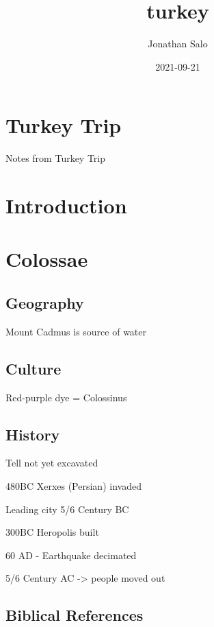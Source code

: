 \documentclass[
]{book}
\title{turkey}
\author{Jonathan Salo}
\date{2021-09-21}
\begin{document}
\maketitle

{
\setcounter{tocdepth}{1}
\tableofcontents
}
\hypertarget{turkey-trip}{%
\chapter{Turkey Trip}\label{turkey-trip}}

Notes from Turkey Trip

\hypertarget{intro}{%
\chapter{Introduction}\label{intro}}

\hypertarget{colossae}{%
\chapter{Colossae}\label{colossae}}

\hypertarget{geography}{%
\section{Geography}\label{geography}}

Mount Cadmus is source of water

\hypertarget{culture}{%
\section{Culture}\label{culture}}

Red-purple dye = Colossinus

\hypertarget{history}{%
\section{History}\label{history}}

Tell not yet excavated

480BC Xerxes (Persian) invaded

Leading city 5/6 Century BC

300BC Heropolis built

60 AD - Earthquake decimated

5/6 Century AC -\textgreater{} people moved out

\hypertarget{biblical-references}{%
\section{Biblical References}\label{biblical-references}}
\end{document}
